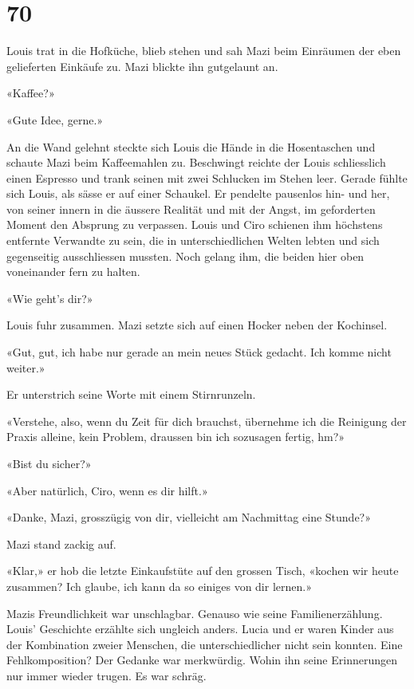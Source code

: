 \chapter{70}



Louis trat in die Hofküche, blieb stehen und sah Mazi beim Einräumen der eben
gelieferten Einkäufe zu. Mazi blickte ihn gutgelaunt an.

«Kaffee?»

«Gute Idee, gerne.»

An die Wand gelehnt steckte sich Louis die Hände in die Hosentaschen und schaute Mazi beim
Kaffeemahlen zu. Beschwingt reichte der Louis schliesslich einen Espresso und trank seinen mit zwei
Schlucken im Stehen leer. Gerade fühlte sich Louis, als sässe er auf einer Schaukel. Er
pendelte pausenlos hin- und her, von seiner innern in die äussere  Realität und mit der Angst, im geforderten Moment den Absprung zu verpassen. Louis und Ciro schienen ihm höchstens entfernte Verwandte zu sein, die in unterschiedlichen Welten lebten und sich gegenseitig ausschliessen mussten. Noch gelang ihm, die beiden hier oben voneinander fern zu  halten. 

«Wie geht’s dir?»

Louis fuhr zusammen. Mazi setzte sich auf einen Hocker neben der Kochinsel. 

«Gut, gut, ich habe nur gerade an mein neues Stück gedacht. Ich komme
nicht weiter.»

Er unterstrich seine Worte mit einem Stirnrunzeln.

«Verstehe, also, wenn du Zeit für dich brauchst, übernehme ich die
Reinigung der Praxis alleine, kein Problem, draussen bin ich sozusagen
fertig, hm?»

«Bist du sicher?»

«Aber natürlich, Ciro, wenn es dir hilft.»

«Danke, Mazi, grosszügig von dir, vielleicht am Nachmittag eine Stunde?»

Mazi stand zackig auf.

«Klar,» er hob die letzte Einkaufstüte auf den grossen Tisch, «kochen wir heute zusammen? Ich glaube,
ich kann da so einiges von dir lernen.»

Mazis Freundlichkeit war unschlagbar. Genauso wie seine Familienerzählung. 
Louis’ Geschichte erzählte sich ungleich anders. Lucia und er waren
Kinder aus der Kombination zweier Menschen, die unterschiedlicher nicht
sein konnten. Eine Fehlkomposition? Der Gedanke war merkwürdig. Wohin 
ihn seine Erinnerungen nur immer wieder trugen. Es war schräg.

